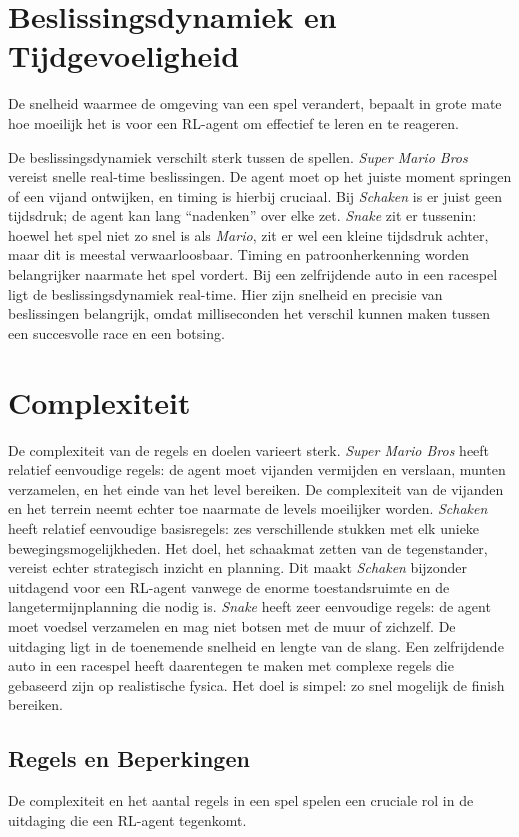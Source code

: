 \documentclass[a4paper,12pt]{report}
\begin{document}
\section{Beslissingsdynamiek en Tijdgevoeligheid}
De snelheid waarmee de omgeving van een spel verandert, bepaalt in grote mate
hoe moeilijk het is voor een RL-agent om effectief te leren en te reageren.

De beslissingsdynamiek verschilt sterk tussen de spellen. \textit{Super Mario
    Bros} vereist snelle real-time beslissingen. De agent moet op het juiste moment
springen of een vijand ontwijken, en timing is hierbij cruciaal. Bij
\textit{Schaken} is er juist geen tijdsdruk; de agent kan lang “nadenken” over
elke zet. \textit{Snake} zit er tussenin: hoewel het spel niet zo snel is als
\textit{Mario}, zit er wel een kleine tijdsdruk achter, maar dit is meestal
verwaarloosbaar. Timing en patroonherkenning worden belangrijker naarmate het
spel vordert. Bij een zelfrijdende auto in een racespel ligt de
beslissingsdynamiek real-time. Hier zijn snelheid en precisie van beslissingen
belangrijk, omdat milliseconden het verschil kunnen maken tussen een
succesvolle race en een botsing.

\section{Complexiteit}
De complexiteit van de regels en doelen varieert sterk. \textit{Super Mario
    Bros} heeft relatief eenvoudige regels: de agent moet vijanden vermijden en
verslaan, munten verzamelen, en het einde van het level bereiken. De
complexiteit van de vijanden en het terrein neemt echter toe naarmate de levels
moeilijker worden. \textit{Schaken} heeft relatief eenvoudige basisregels: zes
verschillende stukken met elk unieke bewegingsmogelijkheden. Het doel, het
schaakmat zetten van de tegenstander, vereist echter strategisch inzicht en
planning. Dit maakt \textit{Schaken} bijzonder uitdagend voor een RL-agent
vanwege de enorme toestandsruimte en de langetermijnplanning die nodig is.
\textit{Snake} heeft zeer eenvoudige regels: de agent moet voedsel verzamelen
en mag niet botsen met de muur of zichzelf. De uitdaging ligt in de toenemende
snelheid en lengte van de slang. Een zelfrijdende auto in een racespel heeft
daarentegen te maken met complexe regels die gebaseerd zijn op realistische
fysica. Het doel is simpel: zo snel mogelijk de finish bereiken.

\subsection{Regels en Beperkingen}
De complexiteit en het aantal regels in een spel spelen een cruciale rol in de
uitdaging die een RL-agent tegenkomt.
\end{document}
